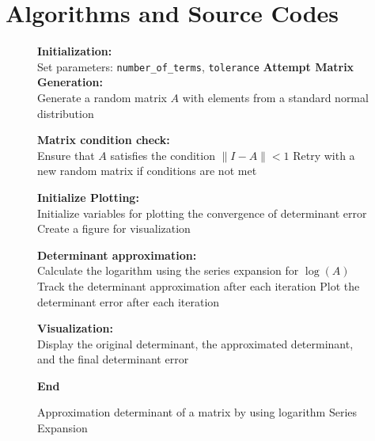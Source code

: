 \chapter{Algorithms and Source Codes}
\begin{figure}[H]
    \centering
    \begin{algorithm}[H]
        \caption{Approximation determinant of a matrix by using logarithm Series Expansion}
        \label{alg-determinant-approximation}
    
    
        \textbf{Initialization:}\\
        Set parameters: \texttt{number\_of\_terms}, \texttt{tolerance}\;
        \textbf{Attempt Matrix Generation:}\\
        Generate a random matrix $A$ with elements from a standard normal distribution\;
    
        \textbf{Matrix condition check:}\\
        Ensure that $A$ satisfies the condition $\lVert I - A \rVert < 1$\;
        Retry with a new random matrix if conditions are not met\;

    
        \textbf{Initialize Plotting:}\\
        Initialize variables for plotting the convergence of determinant error\;
        Create a figure for visualization\;
    
        \textbf{Determinant approximation:}\\
        Calculate the logarithm using the series expansion for $\log(A)$\;
        Track the determinant approximation after each iteration\;
        Plot the determinant error after each iteration\;
    
        \textbf{Visualization:}\\
        Display the original determinant, the approximated determinant, and the final determinant error\;
    
        \textbf{End}
    \end{algorithm}
\end{figure}
